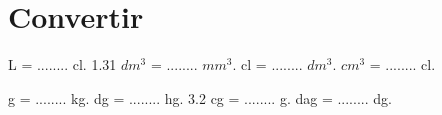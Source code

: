 \section{Convertir}

\begin{questions}
		 L = ........ cl.
		\question \num{1.31} $dm^3$ = ........ $mm^3$.
		 cl = ........ $dm^3$.
		 $cm^3$ = ........ cl.
		
		 g = ........ kg.
		 dg = ........ hg.
		\question \num{3.2} cg = ........ g.
		 dag = ........ dg.
\end{questions}